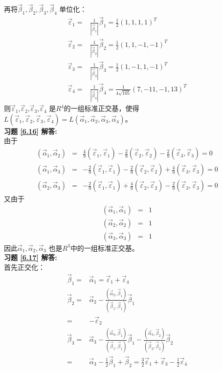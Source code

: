 再将$\vec{\beta}_1,\vec{\beta}_2,\vec{\beta}_3,\vec{\beta}_4$ 单位化：
\begin{align*}
\vec{\varepsilon}_1=&\frac{1}{|\vec{\beta}_1|}\vec{\beta}_1=\frac{1}{2}(1,1,1,1)^T\\
\vec{\varepsilon}_2=&\frac{1}{|\vec{\beta}_2|}\vec{\beta}_2=\frac{1}{2}(1,1,-1,-1)^T\\
\vec{\varepsilon}_3=&\frac{1}{|\vec{\beta}_3|}\vec{\beta}_3=\frac{1}{2}(1,-1,1,-1)^T\\
\vec{\varepsilon}_4=&\frac{1}{|\vec{\beta}_4|}\vec{\beta}_4=\frac{1}{4\sqrt{105}}(7,-11,-1,13)^T
\end{align*}
则$\vec{\varepsilon}_1$,$\vec{\varepsilon}_2$,$\vec{\varepsilon}_3$,$\vec{\varepsilon}_4$ 是$R^4$的一组标准正交基，使得
$L(\vec{\varepsilon}_1,\vec{\varepsilon}_2,\vec{\varepsilon}_3,\vec{\varepsilon}_4)=L(\vec{\alpha}_1,\vec{\alpha}_2,\vec{\alpha}_3,\vec{\alpha}_4)$。\\
\textbf{习题 \ref{6.16} 解答:}\\
由于
\begin{eqnarray*}
   (\vec{\alpha}_1,\vec{\alpha}_2)&=&\frac{4}{9}(\vec{\varepsilon}_1,\vec{\varepsilon}_1)
   -\frac{2}{9}(\vec{\varepsilon}_2,\vec{\varepsilon}_2)-\frac{2}{9}(\vec{\varepsilon}_3,\vec{\varepsilon}_3)=0\\
   (\vec{\alpha}_1,\vec{\alpha}_3)&=&-\frac{2}{9}(\vec{\varepsilon}_1,\vec{\varepsilon}_1)
   -\frac{2}{9}(\vec{\varepsilon}_2,\vec{\varepsilon}_2)+\frac{4}{9}(\vec{\varepsilon}_3,\vec{\varepsilon}_3)=0\\
   (\vec{\alpha}_2,\vec{\alpha}_3)&=&-\frac{2}{9}(\vec{\varepsilon}_1,\vec{\varepsilon}_1)
   +\frac{4}{9}(\vec{\varepsilon}_2,\vec{\varepsilon}_2)-\frac{2}{9}(\vec{\varepsilon}_3,\vec{\varepsilon}_3)=0
\end{eqnarray*}
又由于
\begin{eqnarray*}
   (\vec{\alpha}_1,\vec{\alpha}_1)&=&1\\
   (\vec{\alpha}_2,\vec{\alpha}_2)&=&1\\
   (\vec{\alpha}_3,\vec{\alpha}_3)&=&1
\end{eqnarray*}
因此$\vec{\alpha}_1,\vec{\alpha}_2,\vec{\alpha}_3$ 也是$R^3$中的一组标准正交基。\\
\textbf{习题 \ref{6.17} 解答:}\\
首先正交化：
\begin{align*}
\vec{\beta}_1=&\vec{\alpha}_1=\vec{\varepsilon}_1+\vec{\varepsilon}_4\\
\vec{\beta}_2=&\vec{\alpha}_2-\frac{(\vec{\alpha}_2,\vec{\beta}_1)}{(\vec{\beta}_1,\vec{\beta}_1)}\vec{\beta}_1\\
             =&-\vec{\varepsilon}_2\\
\vec{\beta}_3=&\vec{\alpha}_3-\frac{(\vec{\alpha}_3,\vec{\beta}_1)}{(\vec{\beta}_1,\vec{\beta}_1)}\vec{\beta}_1-
              \frac{(\vec{\alpha}_3,\vec{\beta}_2)}{(\vec{\beta}_2,\vec{\beta}_2)}\vec{\beta}_2\\
             =&\vec{\alpha}_3-\frac{1}{2}\vec{\beta}_1+\vec{\beta}_2=\frac{3}{2}\vec{\varepsilon}_1+\vec{\varepsilon}_3-\frac{1}{2}\vec{\varepsilon}_4
\end{align*}
